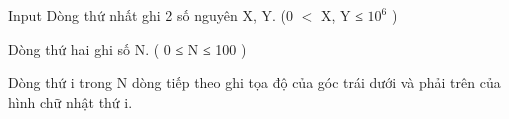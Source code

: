 Input
Dòng thứ nhất ghi 2 số nguyên X, Y. (0 $<$ X, Y ≤ $10^{6}$   )  

   Dòng thứ hai ghi số N. ( 0 ≤ N ≤ 100 )  

   Dòng thứ i trong N dòng tiếp theo ghi tọa độ của góc trái dưới và phải trên của hình chữ nhật thứ i.